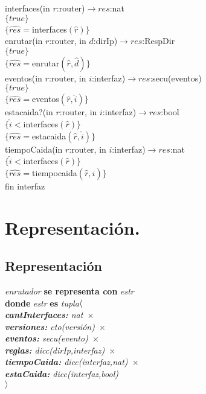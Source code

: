 interfaces(in $r$:router)$\longrightarrow res$:nat\\
$\{true\}$\\
$\{\widehat{res}=$interfaces$(\widehat{r})\}$\\

enrutar(in $r$:router, in $d$:dirIp)$\longrightarrow res$:RespDir\\
$\{true\}$\\
$\{\widehat{res}=$enrutar$(\widehat{r},\widehat{d})\}$\\

eventos(in $r$:router, in $i$:interfaz)$\longrightarrow res$:secu(eventos)\\
$\{true\}$\\
$\{\widehat{res}=$eventos$(\widehat{r},\widehat{i})\}$\\

estacaida?(in $r$:router, in $i$:interfaz)$\longrightarrow res$:bool\\
$\{\widehat{i} < $interfaces$(\widehat{r})\}$\\
$\{\widehat{res}=$estacaida$(\widehat{r},\widehat{i})\}$\\

tiempoCaida(in $r$:router, in $i$:interfaz)$\longrightarrow res$:nat\\
$\{\widehat{i} < $interfaces$(\widehat{r})\}$\\
$\{\widehat{res}=$tiempocaida$(\widehat{r},\widehat{i})\}$\\

fin interfaz\\

\section{Representaci\'on.}






\subsection*{Representaci\'on}
\hspace{-0.75cm}
\textit{enrutador} \textbf{se representa con} \textit{estr}\\
\textbf{donde} \textit{estr} \textbf{es} \textit{tupla$ \\ \langle$\ \\ \textbf{cantInterfaces:} nat\ 	$\times$\   \\ \textbf{versiones:} cto(versi\'on)\ 	$\times$\  \\ \textbf{eventos:} secu(evento)\ $\times$\ \\ \textbf{reglas:} dicc(dirIp,interfaz)\ $\times$\ \\ \textbf{tiempoCaida:} dicc(interfaz,nat)\ $\times$\ \\ \textbf{estaCaida:} dicc(interfaz,bool) \\ $\rangle$}


